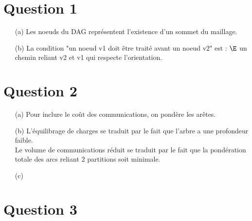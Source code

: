 \documentclass{report}
\begin{document}
\tableofcontents %

\vfill

\section{Question 1}

\begin{itemize}
	\item[(a)] Les noeuds du DAG représentent l'existence d'un sommet du maillage. 
	\item[(b)] La condition "un noeud v1 doit être traité avant un noeud v2" est : $\E$ un chemin reliant v2 et v1 qui respecte l'orientation.
\end{itemize}


\section{Question 2}

\begin{itemize}
	\item[(a)] Pour inclure le coût des communications, on pondère les arêtes.
	\item[(b)] L'équilibrage de charges se traduit par le fait que l'arbre a une profondeur faible. \\
	Le volume de communications réduit se traduit par le fait que la pondération totale des arcs reliant 2 partitions soit minimale. 
	\item[(c)] 
\end{itemize}

\section{Question 3}

\begin{itemize}
	\item[]
\end{itemize}
\end{document}
